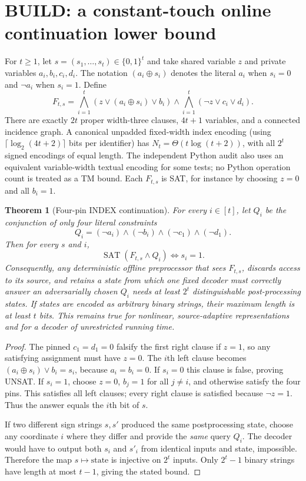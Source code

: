 \documentclass[11pt]{article}
\newtheorem{theorem}{Theorem}
\begin{document}
\section{BUILD: a constant-touch online continuation lower bound}
For $t\ge1$, let $s=(s_1,\ldots,s_t)\in\{0,1\}^t$ and take shared variable $z$ and private variables $a_i,b_i,c_i,d_i$. The notation $(a_i\oplus s_i)$ denotes the literal $a_i$ when $s_i=0$ and $\neg a_i$ when $s_i=1$. Define
\begin{equation}\label{eq:family}
 F_{t,s}=\bigwedge_{i=1}^{t}
 \left(z\vee(a_i\oplus s_i)\vee b_i\right)
 \land\bigwedge_{i=1}^{t}
 \left(\neg z\vee c_i\vee d_i\right).
\end{equation}
There are exactly $2t$ proper width-three clauses, $4t+1$ variables, and a connected incidence graph. A canonical unpadded fixed-width index encoding (using $\lceil\log_2(4t+2)\rceil$ bits per identifier) has $N_t=\Theta(t\log(t+2))$, with all $2^t$ signed encodings of equal length. The independent Python audit also uses an equivalent variable-width textual encoding for some tests; no Python operation count is treated as a TM bound. Each $F_{t,s}$ is SAT, for instance by choosing $z=0$ and all $b_i=1$.

\begin{theorem}[Four-pin INDEX continuation]\label{th:index}
For every $i\in[t]$, let $Q_i$ be the conjunction of only four literal constraints
\[
 Q_i=(\neg a_i)\land(\neg b_i)\land(\neg c_1)\land(\neg d_1).
\]
Then for every $s$ and $i$,
\[
 \boxed{\operatorname{SAT}(F_{t,s}\land Q_i)\iff s_i=1.}
\]
Consequently, any deterministic offline preprocessor that sees $F_{t,s}$, discards access to its source, and retains a state from which one fixed decoder must correctly answer an adversarially chosen $Q_i$ needs at least $2^t$ distinguishable post-processing states. If states are encoded as arbitrary binary strings, their maximum length is at least $t$ bits. This remains true for nonlinear, source-adaptive representations and for a decoder of unrestricted running time.
\end{theorem}
\begin{proof}
The pinned $c_1=d_1=0$ falsify the first right clause if $z=1$, so any satisfying assignment must have $z=0$. The $i$th left clause becomes $(a_i\oplus s_i)\lor b_i=s_i$, because $a_i=b_i=0$. If $s_i=0$ this clause is false, proving UNSAT. If $s_i=1$, choose $z=0$, $b_j=1$ for all $j\ne i$, and otherwise satisfy the four pins. This satisfies all left clauses; every right clause is satisfied because $\neg z=1$. Thus the answer equals the $i$th bit of $s$.

If two different sign strings $s,s'$ produced the same postprocessing state, choose any coordinate $i$ where they differ and provide the \emph{same} query $Q_i$. The decoder would have to output both $s_i$ and $s'_i$ from identical inputs and state, impossible. Therefore the map $s\mapsto\text{state}$ is injective on $2^t$ inputs. Only $2^t-1$ binary strings have length at most $t-1$, giving the stated bound.
\end{proof}
\end{document}
